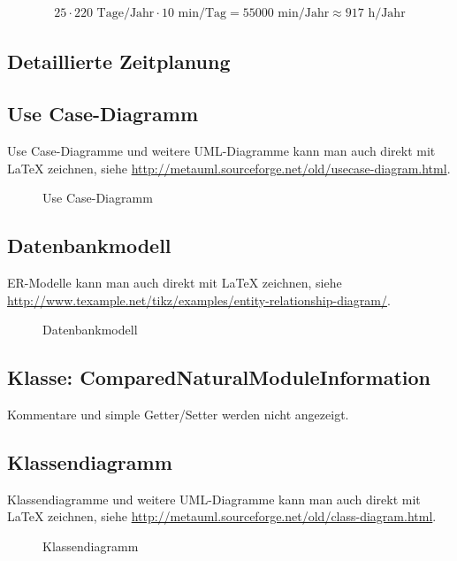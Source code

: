 \begin{eqnarray}
25 \cdot 220 \mbox{ Tage/Jahr} \cdot 10 \mbox{ min/Tag} = 55000 \mbox{ min/Jahr} \approx 917 \mbox{ h/Jahr} 
\end{eqnarray}

\subsection{Detaillierte Zeitplanung}
\label{app:Zeitplanung}



\clearpage

\subsection{Use Case-Diagramm}
\label{app:UseCase}
Use Case-Diagramme und weitere \acs{UML}-Diagramme kann man auch direkt mit \LaTeX{} zeichnen, siehe \zB \url{http://metauml.sourceforge.net/old/usecase-diagram.html}.
\begin{figure}[htb]
\centering
{}
\caption{Use Case-Diagramm}
\end{figure}



\subsection{Datenbankmodell}
\label{app:Datenbankmodell}
ER-Modelle kann man auch direkt mit \LaTeX{} zeichnen, siehe \zB \url{http://www.texample.net/tikz/examples/entity-relationship-diagram/}.
\begin{figure}[htb]
\centering
{}
\caption{Datenbankmodell}
\end{figure}
\clearpage


\clearpage


\clearpage


\subsection{Klasse: ComparedNaturalModuleInformation}
\label{app:CNMI}
Kommentare und simple Getter/Setter werden nicht angezeigt.

\clearpage

\subsection{Klassendiagramm}
\label{app:Klassendiagramm}
Klassendiagramme und weitere \acs{UML}-Diagramme kann man auch direkt mit \LaTeX{} zeichnen, siehe \zB \url{http://metauml.sourceforge.net/old/class-diagram.html}.
\begin{figure}[htb]
\centering
{}
\caption{Klassendiagramm}
\end{figure}
\clearpage


